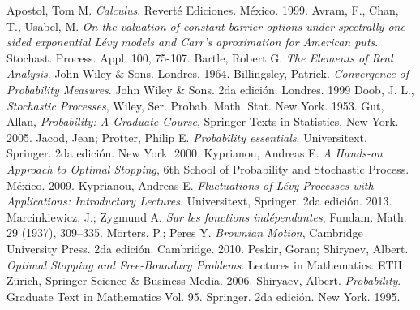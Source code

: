\begin{thebibliography}{9}
\addtolength{\leftmargin}{0.2in}
\setlength{\itemindent}{-0.2in}

 Apostol, Tom M. \emph{Calculus}. Reverté Ediciones. México. 1999.
 Avram, F., Chan, T., Usabel, M. \emph{On the valuation of constant barrier options under spectrally one-sided exponential Lévy models and Carr's aproximation for American puts}. Stochast. Process. Appl. 100, 75-107.
 Bartle, Robert G. \emph{The Elements of Real Analysis}. John Wiley \& Sons. Londres. 1964.
 Billingsley, Patrick. \emph{Convergence of Probability Measures}. John Wiley \& Sons. 2da edición. Londres. 1999
 Doob, J. L., \emph{Stochastic Processes}, Wiley, Ser. Probab. Math. Stat. New York. 1953.
 Gut, Allan, \emph{Probability: A Graduate Course}, Springer Texts in Statistics. New York. 2005.
 Jacod, Jean; Protter, Philip E. \emph{Probability essentials}. Universitext, Springer. 2da edición. New York. 2000.
 Kyprianou, Andreas E. \emph{A Hands-on Approach to Optimal Stopping}, 6th School of Probability and Stochastic Process. México. 2009.
 Kyprianou, Andreas E. \emph{Fluctuations of Lévy Processes with Applications: Introductory Lectures}. Universitext, Springer. 2da edición. 2013.
 Marcinkiewicz, J.; Zygmund A. \emph{Sur les fonctions indépendantes}, Fundam. Math. 29 (1937), 309–335.
 Mörters, P.; Peres Y. \emph{Brownian Motion}, Cambridge University Press. 2da edición. Cambridge. 2010.
 Peskir, Goran; Shiryaev, Albert. \emph{Optimal Stopping and Free-Boundary Problems}. Lectures in Mathematics. ETH Zürich, Springer Science \& Business Media. 2006.
 Shiryaev, Albert. \emph{Probability}. Graduate Text in Mathematics Vol. 95. Springer. 2da edición. New York. 1995.

\end{thebibliography}
